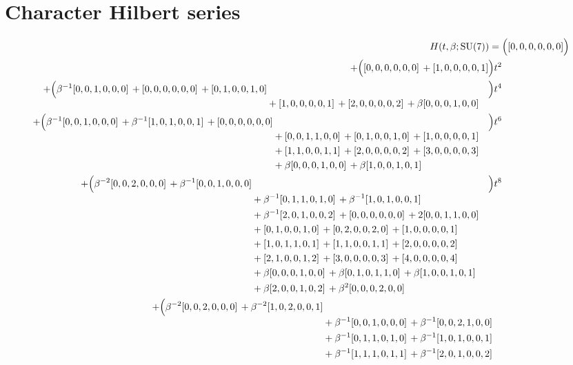 \documentclass[10pt]{article}
\begin{document}
\section{Character Hilbert series}
\[
\begin{aligned}
H(t,\beta;\mathrm{SU}(7)) ={}&
   \Bigl([0,0,0,0,0,0]\Bigr) \\
  + \Bigl([0,0,0,0,0,0]\,+[1,0,0,0,0,1]\Bigr)t^{2} \\
  + \Bigl(\begin{aligned}[t]\beta^{-1}[0,0,1,0,0,0]\,+[0,0,0,0,0,0]\,+[0,1,0,0,1,0] \\
  &{}+[1,0,0,0,0,1]\,+[2,0,0,0,0,2]\,+\beta[0,0,0,1,0,0]\end{aligned}\Bigr)t^{4} \\
  + \Bigl(\begin{aligned}[t]\beta^{-1}[0,0,1,0,0,0]\,+\beta^{-1}[1,0,1,0,0,1]\,+[0,0,0,0,0,0] \\
  &{}+[0,0,1,1,0,0]\,+[0,1,0,0,1,0]\,+[1,0,0,0,0,1] \\
  &{}+[1,1,0,0,1,1]\,+[2,0,0,0,0,2]\,+[3,0,0,0,0,3] \\
  &{}+\beta[0,0,0,1,0,0]\,+\beta[1,0,0,1,0,1]\end{aligned}\Bigr)t^{6} \\
  + \Bigl(\begin{aligned}[t]\beta^{-2}[0,0,2,0,0,0]\,+\beta^{-1}[0,0,1,0,0,0] \\
  &{}+\beta^{-1}[0,1,1,0,1,0]\,+\beta^{-1}[1,0,1,0,0,1] \\
  &{}+\beta^{-1}[2,0,1,0,0,2]\,+[0,0,0,0,0,0]\,+2[0,0,1,1,0,0] \\
  &{}+[0,1,0,0,1,0]\,+[0,2,0,0,2,0]\,+[1,0,0,0,0,1] \\
  &{}+[1,0,1,1,0,1]\,+[1,1,0,0,1,1]\,+[2,0,0,0,0,2] \\
  &{}+[2,1,0,0,1,2]\,+[3,0,0,0,0,3]\,+[4,0,0,0,0,4] \\
  &{}+\beta[0,0,0,1,0,0]\,+\beta[0,1,0,1,1,0]\,+\beta[1,0,0,1,0,1] \\
  &{}+\beta[2,0,0,1,0,2]\,+\beta^{2}[0,0,0,2,0,0]\end{aligned}\Bigr)t^{8} \\
  + \Bigl(\begin{aligned}[t]\beta^{-2}[0,0,2,0,0,0]\,+\beta^{-2}[1,0,2,0,0,1] \\
  &{}+\beta^{-1}[0,0,1,0,0,0]\,+\beta^{-1}[0,0,2,1,0,0] \\
  &{}+\beta^{-1}[0,1,1,0,1,0]\,+\beta^{-1}[1,0,1,0,0,1] \\
  &{}+\beta^{-1}[1,1,1,0,1,1]\,+\beta^{-1}[2,0,1,0,0,2] \\

\end{aligned}
\end{aligned}\]
\end{document}
